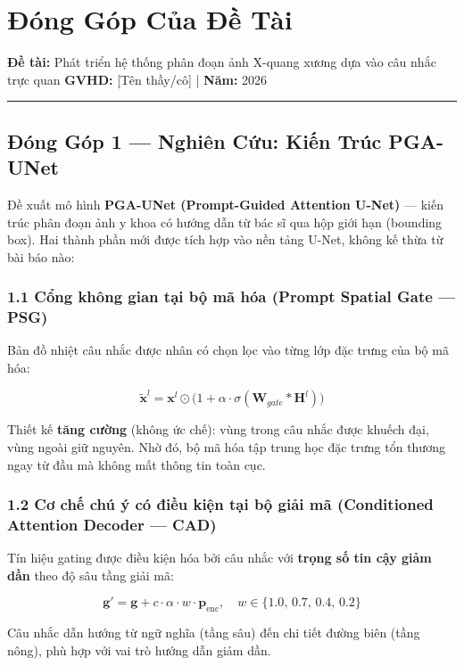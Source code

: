 
\section{Đóng Góp Của Đề Tài}

\textbf{Đề tài:} Phát triển hệ thống phân đoạn ảnh X-quang xương dựa vào câu nhắc trực quan  
\textbf{GVHD:} [Tên thầy/cô] | \textbf{Năm:} 2026

\vspace{0.5em}\hrule\vspace{0.5em}


\subsection{Đóng Góp 1 — Nghiên Cứu: Kiến Trúc PGA-UNet}

Đề xuất mô hình \textbf{PGA-UNet (Prompt-Guided Attention U-Net)} — kiến trúc phân đoạn ảnh y khoa có hướng dẫn từ bác sĩ qua hộp giới hạn (bounding box). Hai thành phần mới được tích hợp vào nền tảng U-Net, không kế thừa từ bài báo nào:


\subsubsection{1.1 Cổng không gian tại bộ mã hóa (Prompt Spatial Gate — PSG)}

Bản đồ nhiệt câu nhắc được nhân có chọn lọc vào từng lớp đặc trưng của bộ mã hóa:

\[
\tilde{\mathbf{x}}^l = \mathbf{x}^l \odot \bigl(1 + \alpha \cdot \sigma(\mathbf{W}_{gate} \ast \mathbf{H}^l)\bigr)
\]

Thiết kế \textbf{tăng cường} (không ức chế): vùng trong câu nhắc được khuếch đại, vùng ngoài giữ nguyên. Nhờ đó, bộ mã hóa tập trung học đặc trưng tổn thương ngay từ đầu mà không mất thông tin toàn cục.


\subsubsection{1.2 Cơ chế chú ý có điều kiện tại bộ giải mã (Conditioned Attention Decoder — CAD)}

Tín hiệu gating được điều kiện hóa bởi câu nhắc với \textbf{trọng số tin cậy giảm dần} theo độ sâu tầng giải mã:

\[
\mathbf{g}' = \mathbf{g} + c \cdot \alpha \cdot w \cdot \mathbf{p}_{\text{enc}}, \quad w \in \{1.0,\, 0.7,\, 0.4,\, 0.2\}
\]

Câu nhắc dẫn hướng từ ngữ nghĩa (tầng sâu) đến chi tiết đường biên (tầng nông), phù hợp với vai trò hướng dẫn giảm dần.


